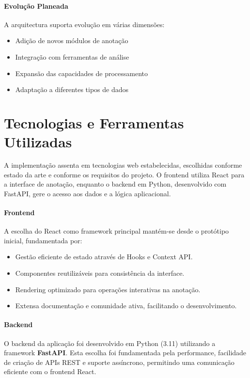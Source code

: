 \paragraph{Evolução Planeada}
A arquitectura suporta evolução em várias dimensões:

\begin{itemize}
    \item Adição de novos módulos de anotação
    \item Integração com ferramentas de análise
    \item Expansão das capacidades de processamento
    \item Adaptação a diferentes tipos de dados
\end{itemize}

\section{Tecnologias e Ferramentas Utilizadas}

A implementação assenta em tecnologias web estabelecidas, escolhidas conforme estado da arte e conforme os requisitos do projeto. O frontend utiliza React para a interface de anotação, enquanto o backend em Python, desenvolvido com FastAPI, gere o acesso aos dados e a lógica aplicacional.

\paragraph{Frontend}
A escolha do React como framework principal mantém-se desde o protótipo inicial, fundamentada por:

\begin{itemize}
    \item Gestão eficiente de estado através de Hooks e Context API.
    \item Componentes reutilizáveis para consistência da interface.
    \item Rendering optimizado para operações interativas na anotação.
    \item Extensa documentação e comunidade ativa, facilitando o desenvolvimento.
\end{itemize}

\paragraph{Backend}
O backend da aplicação foi desenvolvido em Python (3.11) utilizando a framework \textbf{FastAPI}. Esta escolha foi fundamentada pela performance, facilidade de criação de APIs REST e suporte assíncrono, permitindo uma comunicação eficiente com o frontend React.


